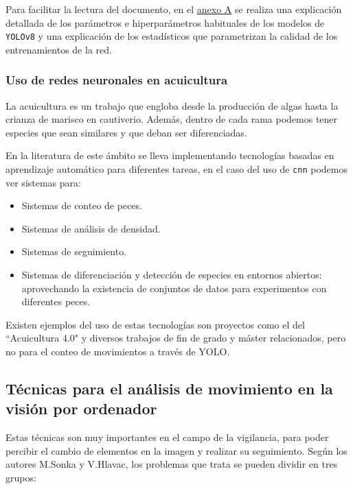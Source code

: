 Para facilitar la lectura del documento, en el \hyperref[subsec:A]{anexo A} se realiza una explicación detallada de los parámetros e hiperparámetros habituales de los modelos de \texttt{YOLOv8} y una explicación 
de los estadísticos que parametrizan la calidad de los entrenamientos de la red.


\subsubsection{Uso de redes neuronales en acuicultura}

La acuicultura es un trabajo que engloba desde la producción de algas hasta la crianza de marisco en cautiverio. Además, dentro de cada rama podemos tener especies que sean similares y que deban ser diferenciadas.

En la literatura de este ámbito se lleva implementando tecnologías basadas en aprendizaje automático para diferentes tareas, en el caso del uso de \texttt{\acrshort{cnn}} podemos ver sistemas para:
\begin{itemize}
    \item Sistemas de conteo de peces\cite{castillomoralSistemaConteoPeces2022}.
    \item Sistemas de análisis de densidad.
    \item Sistemas de seguimiento\cite{leeDetectionCatfishActivity2024}.
    \item Sistemas de diferenciación y detección de especies en entornos abiertos\cite{xiaSituSeaCucumber2018}\cite{ladeAutomatedFishSpecies2023}: aprovechando la existencia de conjuntos de datos
    \cite{ulucanLargeScaleDatasetFish2020} para experimentos con diferentes peces.
\end{itemize}

Existen ejemplos del uso de estas tecnologías son proyectos como el del  ``Acuicultura 4.0"\cite{Acuicultura} y diversos trabajos de fin de grado y máster relacionados, pero no para el conteo de movimientos a través de YOLO.

\clearpage
\subsection{Técnicas para el análisis de movimiento en la visión por ordenador}

Estas técnicas son muy importantes en el campo de la vigilancia, para poder percibir el cambio de elementos en la imagen y realizar su seguimiento. Según los autores M.Sonka y V.Hlavac\cite{sonkaImageProcessingAnalysis2013}, los problemas que 
trata se pueden dividir en tres grupos:


